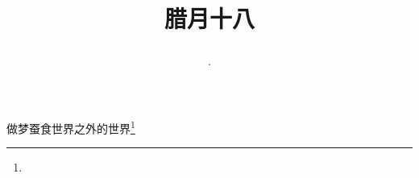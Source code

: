 \title{\date[d=28,m=1,y=2024][year:cn-y,年,month:cn,day:cn,日,·,weekday]·腊月十八 }
做梦蚕食世界之外的世界\footnote{ }

